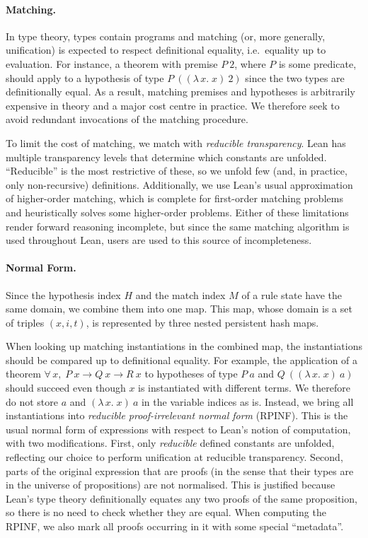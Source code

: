 \documentclass[runningheads,leqno]{llncs}
\newcommand{\para}[1]{\paragraph{\bfseries\upshape #1}}
\newcommand{\Lam}[2]{\ensuremath{\lambda\, #1.\; #2}}
\newcommand{\All}[2]{\ensuremath{\forall\, #1,\; #2}}
\begin{document}
\para{Matching.}
In type theory, types contain programs and matching (or, more generally, unification) is expected to respect definitional equality, i.e.\ equality up to evaluation.
For instance, a theorem with premise $P~2$, where $P$ is some predicate, should apply to a hypothesis of type $P~((\Lam{x}{x})~2)$ since the two types are definitionally equal.
As a result, matching premises and hypotheses is arbitrarily expensive in theory and a major cost centre in practice.
We therefore seek to avoid redundant invocations of the matching procedure.

To limit the cost of matching, we match with \emph{reducible transparency}.
Lean has multiple transparency levels that determine which constants are unfolded.
\enquote{Reducible} is the most restrictive of these, so we unfold few (and, in practice, only non-recursive) definitions.
Additionally, we use Lean's usual approximation of higher-order matching, which is complete for first-order matching problems and heuristically solves some higher-order problems.
Either of these limitations render forward reasoning incomplete, but since the same matching algorithm is used throughout Lean, users are used to this source of incompleteness.

\para{Normal Form.}
Since the hypothesis index $H$ and the match index $M$ of a rule state have the same domain, we combine them into one map.
This map, whose domain is a set of triples $(x, i, t)$, is represented by three nested persistent hash maps.

When looking up matching instantiations in the combined map, the instantiations should be compared up to definitional equality.
For example, the application of a theorem $\All{x}{P~x → Q~x → R~x}$ to hypotheses of type $P~a$ and $Q~((\Lam{x}{x})~a)$ should succeed even though $x$ is instantiated with different terms.
We therefore do not store $a$ and $(\Lam{x}{x})~a$ in the variable indices as is.
Instead, we bring all instantiations into \emph{reducible proof-irrelevant normal form} (RPINF).
This is the usual normal form of expressions with respect to Lean's notion of computation, with two modifications.
First, only \emph{reducible} defined constants are unfolded, reflecting our choice to perform unification at reducible transparency.
Second, parts of the original expression that are proofs (in the sense that their types are in the universe of propositions) are not normalised.
This is justified because Lean's type theory definitionally equates any two proofs of the same proposition, so there is no need to check whether they are equal.
When computing the RPINF, we also mark all proofs occurring in it with some special \enquote{metadata}.
\end{document}

